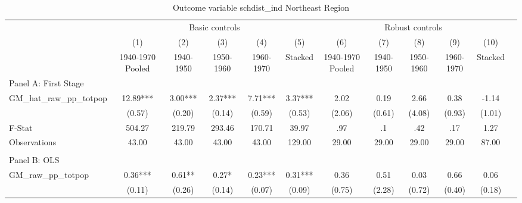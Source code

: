  \begin{table}[htbp]\centering {} \begin{threeparttable} \caption{Outcome variable schdist\_ind Northeast Region} \begin{tabular}{l*{11}{c}} \toprule
          &\multicolumn{5}{c}{Basic controls}                                   &\multicolumn{5}{c}{Robust controls}                                  \\\cmidrule(lr){2-6}\cmidrule(lr){7-11}
          &\multicolumn{1}{c}{(1)}&\multicolumn{1}{c}{(2)}&\multicolumn{1}{c}{(3)}&\multicolumn{1}{c}{(4)}&\multicolumn{1}{c}{(5)}&\multicolumn{1}{c}{(6)}&\multicolumn{1}{c}{(7)}&\multicolumn{1}{c}{(8)}&\multicolumn{1}{c}{(9)}&\multicolumn{1}{c}{(10)}\\
          &\multicolumn{1}{c}{1940-1970 Pooled}&\multicolumn{1}{c}{1940-1950}&\multicolumn{1}{c}{1950-1960}&\multicolumn{1}{c}{1960-1970}&\multicolumn{1}{c}{Stacked}&\multicolumn{1}{c}{1940-1970 Pooled}&\multicolumn{1}{c}{1940-1950}&\multicolumn{1}{c}{1950-1960}&\multicolumn{1}{c}{1960-1970}&\multicolumn{1}{c}{Stacked}\\
\cmidrule(lr){1-11}
\multicolumn{10}{l}{Panel A: First Stage}\\
\cmidrule(lr){1-11}
GM\_hat\_raw\_pp\_totpop&     12.89***&      3.00***&      2.37***&      7.71***&      3.37***&      2.02   &      0.19   &      2.66   &      0.38   &     -1.14   \\
          &    (0.57)   &    (0.20)   &    (0.14)   &    (0.59)   &    (0.53)   &    (2.06)   &    (0.61)   &    (4.08)   &    (0.93)   &    (1.01)   \\
\midrule
F-Stat    &    504.27   &    219.79   &    293.46   &    170.71   &     39.97   &       .97   &        .1   &       .42   &       .17   &      1.27   \\
Observations&     43.00   &     43.00   &     43.00   &     43.00   &    129.00   &     29.00   &     29.00   &     29.00   &     29.00   &     87.00   \\
\cmidrule[\heavyrulewidth](lr){1-11} \\ \cmidrule[\heavyrulewidth](lr){1-11}
\multicolumn{10}{l}{Panel B: OLS}\\
\cmidrule(lr){1-11}
GM\_raw\_pp\_totpop&      0.36***&      0.61** &      0.27*  &      0.23***&      0.31***&      0.36   &      0.51   &      0.03   &      0.66   &      0.06   \\
          &    (0.11)   &    (0.26)   &    (0.14)   &    (0.07)   &    (0.09)   &    (0.75)   &    (2.28)   &    (0.72)   &    (0.40)   &    (0.18)   \\

\end{tabular}
\end{threeparttable}
\end{table}
